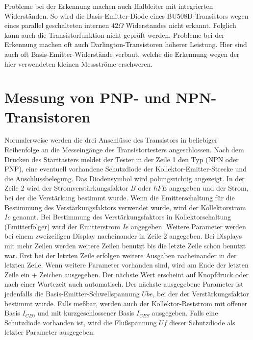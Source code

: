 Probleme bei der Erkennung machen auch Halbleiter mit integrierten Widerständen.
So wird die Basis-Emitter-Diode eines BU508D-Transistors wegen eines parallel geschalteten internen
\(42 \Omega\) Widerstandes nicht erkannt.
Folglich kann auch die Transistorfunktion nicht geprüft werden.
Probleme bei der Erkennung machen oft auch Darlington-Transistoren höherer Leistung. Hier sind auch
oft Basis-Emitter-Widerstände verbaut, welche die Erkennung wegen der hier verwendeten kleinen Messströme erschweren.

\section{Messung von PNP- und NPN-Transistoren}
Normalerweise werden die drei Anschlüsse des Transistors in beliebiger Reihenfolge an die Messeingänge des
Transistortesters angeschlossen.
Nach dem Drücken des Starttasters meldet der Tester in der Zeile 1 den Typ (NPN oder PNP), 
eine eventuell vorhandene Schutzdiode der Kollektor-Emitter-Strecke und
die Anschlussbelegung. Das Diodensymbol wird  polungsrichtig angezeigt.
In der Zeile 2 wird der Stromverstärkungsfaktor \(B\) oder \(hFE\) angegeben und der Strom, bei der die Verstärkung
bestimmt wurde. Wenn die Emitterschaltung für die Bestimmung des Verstärkungsfaktors verwendet wurde,
wird der Kollektorstrom \(Ic\) genannt. Bei Bestimmung des Verstärkungsfaktors in Kollektorschaltung (Emitterfolger)
wird der Emitterstrom \(Ie\) angegeben. Weitere Parameter werden bei einem zweizeiligen Display
nacheinander in Zeile 2 angegeben. Bei Displays mit mehr Zeilen werden weitere Zeilen benutzt bis
die letzte Zeile schon benutzt war.
Erst bei der letzten Zeile erfolgen weitere Ausgaben nacheinander in der letzten Zeile.
Wenn weitere Parameter vorhanden sind, wird am Ende der letzten Zeile ein + Zeichen ausgegeben.
Der nächste Wert erscheint auf Knopfdruck oder nach einer Wartezeit auch automatisch.
Der nächste ausgegebene Parameter ist jedenfalls die Basis-Emitter-Schwellspannung \(Ube\),
bei der der Verstärkungsfaktor bestimmt wurde.
Falls meßbar, werden auch der Kollektor-Reststrom mit offener Basis \(I_{CE0}\) und mit kurzgeschlossener
Basis \(I_{CES}\) ausgegeben.
Falls eine Schutzdiode vorhanden ist, wird die Flußspannung \(Uf\) dieser Schutzdiode als letzter Parameter ausgegeben.



